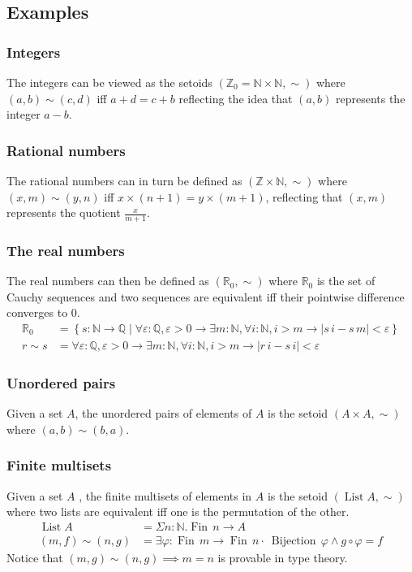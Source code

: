 \documentclass[envcountsame]{llncs}
\newcommand{\N}{\mathbb{N}}
\newcommand{\Q}{\mathbb{Q}}
\newcommand{\R}{\mathbb{R}}
\newcommand{\Z}{\mathbb{Z}}
\providecommand{\set}  [1]{\left\{#1\right\}}
\DeclareMathOperator{\List}{List}
\DeclareMathOperator{\Fin}{Fin}
\DeclareMathOperator{\Bijection}{Bijection}
\begin{document}
\subsection{Examples}\label{sec:setoids:examples}
\subsubsection*{Integers}
The integers can be viewed as the setoids $(\Z_0=\N\times\N,\sim)$ where $(a,b)\sim(c,d)$ if{f} $a+d=c+b$ reflecting the idea that $(a,b)$ represents the integer $a-b$.
\subsubsection*{Rational numbers}
The rational numbers can in turn be defined as $(\Z\times\N,\sim)$ where $(x,m)\sim(y,n)$ if{f} $x\times(n+1)=y\times(m+1)$, reflecting that $(x,m)$ represents the quotient $\frac {x}{m+1}$.


\subsubsection*{The real numbers}

The real numbers can then be defined as $(\R_0,\sim)$ where $\R_0$ is the set of Cauchy sequences and two sequences are equivalent if{f} their pointwise difference converges to $0$.
\begin{align*}
\R_0&=\set{s : \N\to\Q \mid \forall\varepsilon :\Q,\varepsilon>0\to\exists m:\N, \forall i:\N, i>m\to |s\,i - s\, m|<\varepsilon}\\
r\sim s &= \forall\varepsilon :\Q,\varepsilon>0\to\exists m:\N, \forall i:\N, i>m\to |r\,i - s\,i|<\varepsilon
\end{align*}

\subsubsection*{Unordered pairs}
Given a set $A$, the unordered pairs of elements of $A$ is the setoid $(A\times A,\sim)$ where
$(a,b)\sim(b,a)$.

\subsubsection*{Finite multisets}
Given a set $A$ , the finite multisets of elements in $A$ is the setoid $(\List A,\sim)$ where two lists are equivalent if{f} one is the permutation of the other.
\begin{align*}
\List A &= \Sigma n:\N.\Fin\,n\to A\\
(m,f)\sim(n,g) &= \exists \varphi : \Fin\,m \to \Fin\,n \cdot\ \Bijection\,\varphi \land g\circ\varphi = f
\end{align*}
Notice that $(m,g)\sim(n,g)\implies m=n$ is provable in type theory. 
\end{document}
